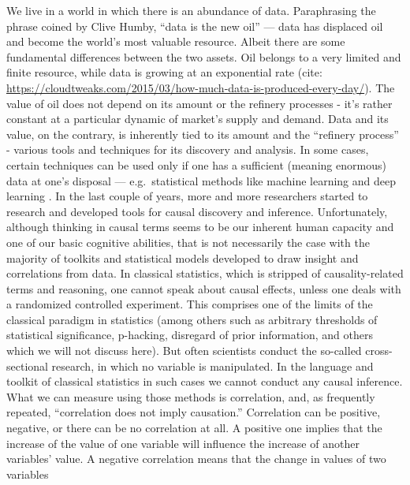\documentclass[
  10pt,
  dvipsnames,enabledeprecatedfontcommands]{scrartcl}
\begin{document}
We live in a world in which there is an abundance of data. Paraphrasing
the phrase coined by Clive Humby, ``data is the new oil'' --- data has
displaced oil and become the world's most valuable resource. Albeit
there are some fundamental differences between the two assets. Oil
belongs to a very limited and finite resource, while data is growing at
an exponential rate (cite:
\url{https://cloudtweaks.com/2015/03/how-much-data-is-produced-every-day/}).
The value of oil does not depend on its amount or the refinery processes
- it's rather constant at a particular dynamic of market's supply and
demand. Data and its value, on the contrary, is inherently tied to its
amount and the ``refinery process'' - various tools and techniques for
its discovery and analysis. In some cases, certain techniques can be
used only if one has a sufficient (meaning enormous) data at one's
disposal --- e.g.~statistical methods like machine learning and deep
learning . In the last couple of years, more and more researchers started to
research and developed tools for causal discovery and inference.
Unfortunately, although thinking in causal terms seems to be our
inherent human capacity and one of our basic cognitive abilities, that
is not necessarily the case with the majority of toolkits and
statistical models developed to draw insight and correlations from data.
In classical statistics, which is stripped of causality-related terms
and reasoning, one cannot speak about causal effects, unless one deals
with a randomized controlled experiment. This comprises one of the
limits of the classical paradigm in statistics (among others such as
arbitrary thresholds of statistical significance, p-hacking, disregard
of prior information, and others which we will not discuss here). But
often scientists conduct the so-called cross-sectional research, in
which no variable is manipulated. In the language and toolkit of
classical statistics in such cases we cannot conduct any causal
inference. What we can measure using those methods is correlation, and,
as frequently repeated, ``correlation does not imply causation.''
Correlation can be positive, negative, or there can be no correlation at
all. A positive one implies that the increase of the value of one
variable will influence the increase of another variables' value. A
negative correlation means that the change in values of two variables
\end{document}
